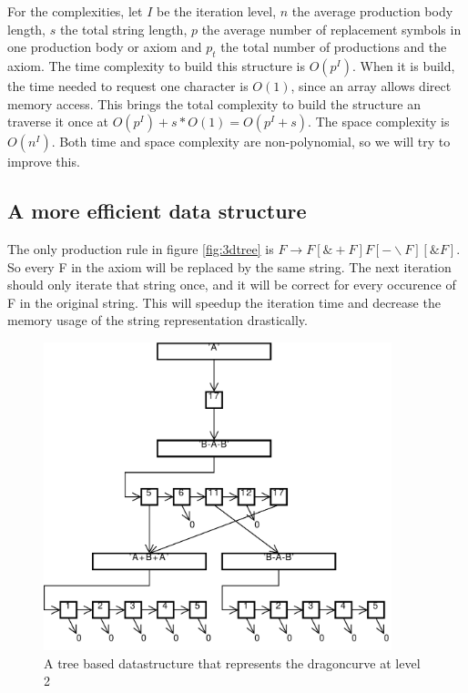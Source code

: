 \documentclass[11pt,a4paper]{article}
\begin{document}
For the complexities, let $I$ be the iteration level, $n$ the average production body length, $s$ the total string length, $p$ the average number of replacement symbols in one production body or axiom and $p_t$ the total number of productions and the axiom.
The time complexity to build this structure is $O(p^I)$. When it is build, the time needed to request one character is $O(1)$, since an array allows direct memory access. This brings the total complexity to build the structure an traverse it once at $O(p^I)+s*O(1) = O(p^I+s)$.
The space complexity is $O(n^I)$. Both time and space complexity are non-polynomial, so we will try to improve this.

\subsection{A more efficient data structure} %

The only production rule in figure \ref{fig:3dtree} is $F \rightarrow F[\&+F]F[-\backslash F][\&F]$. So every F in the axiom will be replaced by the same string. The next iteration should only iterate that string once, and it will be correct for every occurence of F in the original string. This will speedup the iteration time and decrease the memory usage of the string representation drastically.


\begin{figure}[h!]
  \centering
  \includegraphics[width=0.9\textwidth]{struct.pdf}
  \caption{A tree based datastructure that represents the dragoncurve at level 2}
  \label{fig:struct}
\end{figure}
\end{document}
